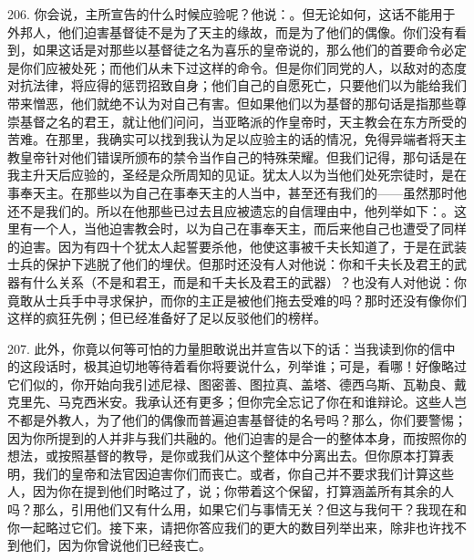 206. 你会说，主所宣告的什么时候应验呢？他说：。但无论如何，这话不能用于外邦人，他们迫害基督徒不是为了天主的缘故，而是为了他们的偶像。你们没有看到，如果这话是对那些以基督徒之名为喜乐的皇帝说的，那么他们的首要命令必定是你们应被处死；而他们从未下过这样的命令。但是你们同党的人，以敌对的态度对抗法律，将应得的惩罚招致自身；他们自己的自愿死亡，只要他们以为能给我们带来憎恶，他们就绝不认为对自己有害。但如果他们以为基督的那句话是指那些尊崇基督之名的君王，就让他们问问，当亚略派的作皇帝时，天主教会在东方所受的苦难。在那里，我确实可以找到我认为足以应验主的话的情况，免得异端者将天主教皇帝针对他们错误所颁布的禁令当作自己的特殊荣耀。但我们记得，那句话是在我主升天后应验的，圣经是众所周知的见证。犹太人以为当他们处死宗徒时，是在事奉天主。在那些以为自己在事奉天主的人当中，甚至还有我们的——虽然那时他还不是我们的。所以在他那些已过去且应被遗忘的自信理由中，他列举如下：。这里有一个人，当他迫害教会时，以为自己在事奉天主，而后来他自己也遭受了同样的迫害。因为有四十个犹太人起誓要杀他，他使这事被千夫长知道了，于是在武装士兵的保护下逃脱了他们的埋伏。但那时还没有人对他说：你和千夫长及君王的武器有什么关系（不是和君王，而是和千夫长及君王的武器）？也没有人对他说：你竟敢从士兵手中寻求保护，而你的主正是被他们拖去受难的吗？那时还没有像你们这样的疯狂先例；但已经准备好了足以反驳他们的榜样。\par

207. 此外，你竟以何等可怕的力量胆敢说出并宣告以下的话：当我读到你的信中的这段话时，极其迫切地等待着看你将要说什么，列举谁；可是，看哪！好像略过它们似的，你开始向我引述尼禄、图密善、图拉真、盖塔、德西乌斯、瓦勒良、戴克里先、马克西米安。我承认还有更多；但你完全忘记了你在和谁辩论。这些人岂不都是外教人，为了他们的偶像而普遍迫害基督徒的名号吗？那么，你们要警惕；因为你所提到的人并非与我们共融的。他们迫害的是合一的整体本身，而按照你的想法，或按照基督的教导，是你或我们从这个整体中分离出去。但你原本打算表明，我们的皇帝和法官因迫害你们而丧亡。或者，你自己并不要求我们计算这些人，因为你在提到他们时略过了，说；你带着这个保留，打算涵盖所有其余的人吗？那么，引用他们又有什么用，如果它们与事情无关？但这与我何干？我现在和你一起略过它们。接下来，请把你答应我们的更大的数目列举出来，除非也许找不到他们，因为你曾说他们已经丧亡。\par

